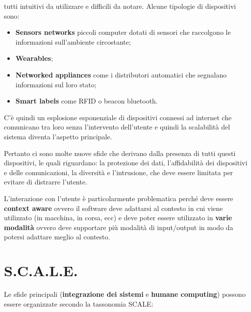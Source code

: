 tutti intuitivi da utilizzare e difficili da notare.
Alcune tipologie di dispositivi sono:

\begin{itemize}
\item \textbf{Sensors networks} piccoli computer dotati di sensori che
  raccolgono le informazioni sull'ambiente circostante;
\item \textbf{Wearables};
\item \textbf{Networked appliances} come i distributori automatici che
  segnalano informazioni sul loro stato;
\item \textbf{Smart labels} come RFID o beacon bluetooth.

\end{itemize}

C'è quindi un esplosione esponenziale di dispositivi connessi ad
internet che comunicano tra loro senza l'intervento dell'utente e
quindi la scalabilità del sistema diventa l'aspetto principale.

Pertanto ci sono molte nuove sfide che derivano dalla presenza di tutti
questi dispositivi, le quali riguardano: la protezione dei dati, l'affidabilità
dei dispositivi e delle comunicazioni, la diversità e l'intrusione, che
deve essere limitata per evitare di distrarre l'utente.

L'interazione con l'utente è particolarmente problematica perché deve
essere \textbf{context aware} ovvero il software deve adattarsi al
contesto in cui viene utilizzato (in macchina, in corsa, ecc) e deve
poter essere utilizzato in \textbf{varie modalità} ovvero deve
supportare più modalità di input/output in modo da potersi adattare
meglio al contesto.

\section{S.C.A.L.E.}
\label{s.c.a.l.e.}

Le sfide principali (\textbf{integrazione dei sistemi} e \textbf{humane
computing}) possono essere organizzate secondo la tassonomia SCALE:

